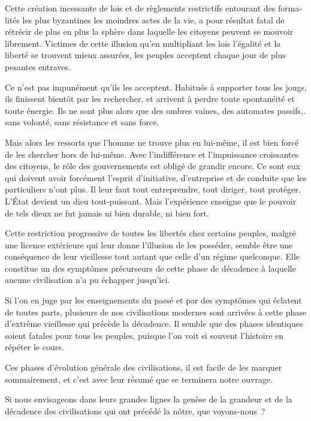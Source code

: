 \documentclass[french,twoside]{book} %
\begin{document}
Cette création incessante de lois et de règlements restrictifs entourant des forma­lités les plus byzantines les moindres actes de la vie, a pour résultat fatal de rétrécir de plus en plus la sphère dans laquelle les citoyens peuvent se mouvoir librement. Victimes de cette illusion qu’en multipliant les lois l’égalité et la liberté se trouvent mieux assurées, les peuples acceptent chaque jour de plus pesantes entraves.\par
Ce n’est pas impunément qu’ils les acceptent. Habitués à supporter tous les jougs, ils finissent bientôt par les rechercher, et arrivent à perdre toute spontanéité et toute énergie. Ils ne sont plus alors que des ombres vaines, des automates passifs,. sans volonté, sans résistance et sans force.\par
Mais alors les ressorts que l’homme ne trouve plus en lui-même, il est bien forcé de les chercher hors de lui-même. Avec l’indifférence et l’impuissance croissantes des citoyens, le rôle des gouvernements est obligé de grandir encore. Ce sont eux qui doivent avoir forcément l’esprit d’initiative, d’entreprise et de conduite que les particuliers n’ont plus. Il leur faut tout entreprendre, tout diriger, tout protéger. L’État devient un dieu tout-puissant. Mais l’expérience enseigne que le pouvoir de tels dieux ne fut jamais ni bien durable, ni bien fort.\par
Cette restriction progressive de toutes les libertés chez certains peuples, malgré une licence extérieure qui leur donne l’illusion de les posséder, semble être une conséquence de leur vieillesse tout autant que celle d’un régime quelconque. Elle constitue un des symptômes précurseurs de cette phase de décadence à laquelle aucune civilisation n’a pu échapper jusqu’ici.\par
Si l’on en juge par les enseignements du passé et par des symptômes qui éclatent de toutes parts, plusieurs de nos civilisations modernes sont arrivées à cette phase d’extrême vieillesse qui précède la décadence. Il semble que des phases identiques soient fatales pour tous les peuples, puisque l’on voit si souvent l’histoire en répéter le cours.\par
Ces phases d’évolution générale des civilisations, il est facile de les marquer sommairement, et c’est avec leur résumé que se terminera notre ouvrage.\par
Si nous envisageons dans leurs grandes lignes la genèse de la grandeur et de la décadence des civilisations qui ont précédé la nôtre, que voyons-nous ?\par
\end{document}

